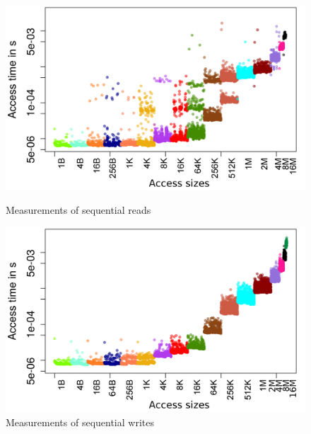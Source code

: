 \documentclass{superfri}
\begin{document}
	\begin{figure}[b]
		\centering
		\begin{minipage}{0.47\textwidth}
			\includegraphics[width=\textwidth]{src/plot_SizeSorted_log_read_seq.png}
			\caption{Measurements of sequential reads}
			\label{read_seq}
		\end{minipage}
		\hfill
		\begin{minipage}{0.47\textwidth}
			\includegraphics[width=\textwidth]{src/plot_SizeSorted_log_write_seq.png}
			\caption{Measurements of sequential writes}
			\label{write_seq}
		\end{minipage}
	\end{figure}
\end{document}
